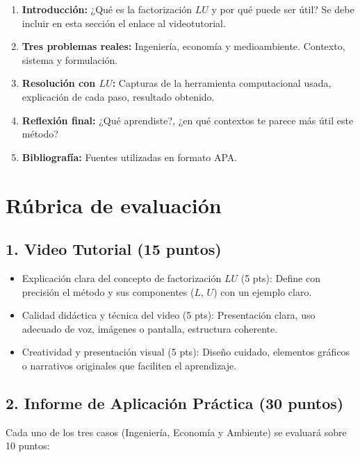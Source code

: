\documentclass[a4,11pt]{aleph-notas}
\begin{document}
\begin{enumerate}[leftmargin=*, label={\textbf{\arabic*.}}]
\item \textbf{Introducción:} ¿Qué es la factorización $LU$ y por qué puede ser útil? Se debe incluir en esta sección el enlace al videotutorial.
\item \textbf{Tres problemas reales:} Ingeniería, economía y medioambiente. Contexto, sistema y formulación.
\item \textbf{Resolución con $LU$:} Capturas de la herramienta computacional usada, explicación de cada paso, resultado obtenido.
\item \textbf{Reflexión final:} ¿Qué aprendiste?, ¿en qué contextos te parece más útil este método?
\item \textbf{Bibliografía:} Fuentes utilizadas en formato APA.
\end{enumerate}


\section{Rúbrica de evaluación}  

\subsection*{1. Video Tutorial (15 puntos)}  
\begin{itemize}[leftmargin=*]
    \item {Explicación clara del concepto de factorización $LU$} (5 pts):  
    Define con precisión el método y sus componentes ($L$, $U$) con un ejemplo claro.

    \item {Calidad didáctica y técnica del video} (5 pts):  
    Presentación clara, uso adecuado de voz, imágenes o pantalla, estructura coherente.

    \item {Creatividad y presentación visual} (5 pts):  
    Diseño cuidado, elementos gráficos o narrativos originales que faciliten el aprendizaje.
\end{itemize}

\subsection*{2. Informe de Aplicación Práctica (30 puntos)}  

{Cada uno de los tres casos (Ingeniería, Economía y Ambiente) se evaluará sobre 10 puntos:}  
\end{document}
